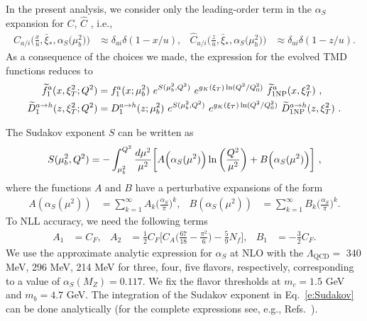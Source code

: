 \documentclass[aps,preprintnumbers,showpacs,nofootinbib,superscriptaddress,floatfix]{revtex4}
\newcommand{\bT}{\xi_T}
\newcommand{\bb}{\xi}
\begin{document}
In the present analysis, we consider only the leading-order term
in the $\alpha_S$ expansion for $C$, $\hat{C}$ , i.e., 
\begin{align} 
C_{a/i} \Big( \frac{x}{u}, \bar{\bb}_\ast, \alpha_S\big(\mu_b^2\big)  \Big) 
&\approx
\delta_{ai} \delta(1-x/u),
&
\hat{C}_{a/i} \Big( \frac{z}{u}, \bar{\bb}_\ast, \alpha_S\big(\mu_b^2\big) \Big)
 &\approx
\delta_{ai} \delta(1-z/u).
\end{align}  
As a consequence of the choices we made, 
the expression for the evolved TMD functions reduces to
\begin{align}   
\widetilde{f}_1^a (x,  \bT^2; Q^2) &= f_1^a (x ; \mu_b^2) 
\  e^{S (\mu_b^2, Q^2)} \  e^{g_K(\bT) \ln (Q^2 / Q_0^2)} \  \widetilde{f}_{1 {\rm NP}}^a (x, \bT^2) \ ,
\label{e:TMDevol1b} \\
\widetilde{D}_1^{a\to h} (z, \bT^2; Q^2) &= D_1^{a\to h} (z; \mu_b^2) \  e^{S (\mu_b^2, Q^2)} \  e^{g_K( \bT) \ln (Q^2 / Q_0^2)} \  \widetilde{D}_{1 {\rm NP}}^{a\to h} (z, \bT^2) \  .
\label{e:TMDevol2b}
\end{align}

The Sudakov exponent $S$ 
can be written as
\begin{equation} 
S(\mu_b^2,Q^2)=-\int_{\mu_b^2}^{Q^2}{d\mu^2\over \mu^2}
\bigg[A\Big(\alpha_S(\mu^2)\Big)\ln\bigg({Q^2\over \mu^2}\bigg) 
+ B\Big(\alpha_S(\mu^2)\Big) \bigg] \ ,
\label{e:Sudakov} 
\end{equation} 
where the functions $A$ and $B$ have a perturbative expansions of the form
\begin{align}
A\left(\alpha_S(\mu^2)\right) &= \sum_{k=1}^{\infty}A_k
\bigg(\frac{\alpha_S}{\pi} \bigg)^k,
&
B\left(\alpha_S(\mu^2)\right) &= \sum_{k=1}^{\infty}B_k
\bigg(\frac{\alpha_S}{\pi} \bigg)^k.
\end{align} 
To NLL accuracy, we need the following 
terms~\cite{Davies:1984hs,Collins:1984kg}
\begin{align}
A_1&= C_F, 
&
A_2&=
\frac{1}{2} C_F  \bigg[
C_A \bigg( \frac{67}{18} - \frac{\pi^2}{6} \bigg)
- \frac{5}{9} N_f \bigg],
&
B_1&= - \frac{3}{2}C_F.
\end{align} 
We use the approximate analytic expression for $\alpha_S$ at NLO with the
$\Lambda_{\text{QCD}}=$ 340 MeV, 296 MeV, 214 MeV for three, four, five
flavors, respectively, corresponding to a value of $\alpha_S(M_Z)=0.117$. 
We fix the flavor thresholds at $m_c=1.5$ GeV and 
$m_b= 4.7$ GeV. The integration of the Sudakov exponent in
Eq.~\eqref{e:Sudakov} can
be done analytically (for the complete expressions see, e.g.,
Refs.~\cite{Frixione:1998dw,Bozzi:2005wk,Echevarria:2012pw}).  
\end{document}

